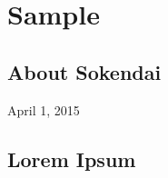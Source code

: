 \chapter{Sample}\label{chapter:sample}

\graphicspath{{Manuscript/Sample/Figs/}}

\section{About Sokendai}


April 1, 2015

\section{Lorem Ipsum}

%

